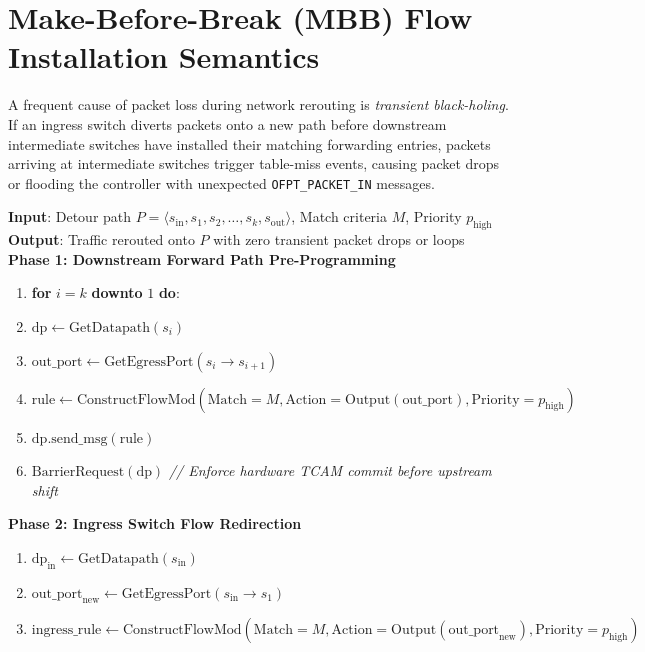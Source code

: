 \section{Make-Before-Break (MBB) Flow Installation Semantics}
\label{sec:mbb}
A frequent cause of packet loss during network rerouting is \textit{transient black-holing}. If an ingress switch diverts packets onto a new path before downstream intermediate switches have installed their matching forwarding entries, packets arriving at intermediate switches trigger table-miss events, causing packet drops or flooding the controller with unexpected \texttt{OFPT\_PACKET\_IN} messages.

\begin{tcolorbox}[colback=codebg,colframe=sdnnavy!80,arc=3pt,title=\textbf{Algorithm 1: Make-Before-Break (MBB) Flow-Mod Installation Protocol}]
\small\sffamily
\textbf{Input}: Detour path $P = \langle s_{\text{in}}, s_1, s_2, \dots, s_k, s_{\text{out}} \rangle$, Match criteria $M$, Priority $p_{\text{high}}$\\
\textbf{Output}: Traffic rerouted onto $P$ with zero transient packet drops or loops\\[0.2cm]
\textbf{Phase 1: Downstream Forward Path Pre-Programming}
\begin{enumerate}[leftmargin=1.5em,noitemsep]
  \item \textbf{for} $i = k$ \textbf{downto} $1$ \textbf{do}:
  \item \quad $\text{dp} \gets \text{GetDatapath}(s_i)$
  \item \quad $\text{out\_port} \gets \text{GetEgressPort}(s_i \to s_{i+1})$
  \item \quad $\text{rule} \gets \text{ConstructFlowMod}(\text{Match}=M, \text{Action}=\text{Output}(\text{out\_port}), \text{Priority}=p_{\text{high}})$
  \item \quad $\text{dp}.\text{send\_msg}(\text{rule})$
  \item \quad $\text{BarrierRequest}(\text{dp})$ \quad \textit{// Enforce hardware TCAM commit before upstream shift}
\end{enumerate}
\textbf{Phase 2: Ingress Switch Flow Redirection}
\begin{enumerate}[leftmargin=1.5em,noitemsep,resume]
  \item $\text{dp}_{\text{in}} \gets \text{GetDatapath}(s_{\text{in}})$
  \item $\text{out\_port}_{\text{new}} \gets \text{GetEgressPort}(s_{\text{in}} \to s_1)$
  \item $\text{ingress\_rule} \gets \text{ConstructFlowMod}(\text{Match}=M, \text{Action}=\text{Output}(\text{out\_port}_{\text{new}}), \text{Priority}=p_{\text{high}})$

\end{enumerate}
\end{tcolorbox}
